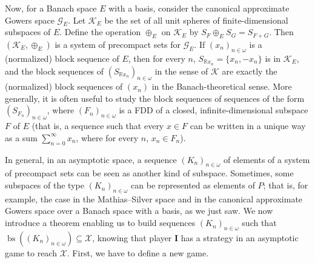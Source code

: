\documentclass[a4paper,11pt]{article}
\theoremstyle{definition}
\numberwithin{equation}{section}
\newcommand{\R}{\mathbb{R}}
\newcommand{\X}{\mathcal{X}}
\newcommand{\G}{\mathcal{G}}
\newcommand{\I}{\textbf{I}}
\newcommand{\K}{\mathcal{K}}
\DeclareMathOperator{\bs}{bs}
\begin{document}
\smallskip

Now, for a Banach space $E$ with a basis, consider the canonical approximate Gowers space $\G_E$. Let $\K_E$ be the set of all unit spheres of finite-dimensional subspaces of $E$. Define the operation $\oplus_E$ on $\K_E$ by $S_F \oplus_E S_G = S_{F + G}$. Then $(\K_E, \oplus_E)$ is a system of precompact sets for $\G_E$. If $(x_n)_{n \in \omega}$ is a (normalized) block sequence of $E$, then for every $n$, $S_{\R x_n} = \{x_n, -x_n\}$ is in $\K_E$, and the block sequences of $(S_{\R x_n})_{n \in \omega}$ in the sense of $\K$ are exactly the (normalized) block sequences of $(x_n)$ in the Banach-theoretical sense. More generally, it is often useful to study the block sequences of sequences of the form $(S_{F_n})_{n \in \omega}$, where $(F_n)_{n \in \omega}$ is a FDD of a closed, infinite-dimensional subspace $F$ of $E$ (that is, a sequence such that every $x \in F$ can be written in a unique way as a sum $\sum_{n = 0}^\infty x_n$, where for every $n$, $x_n \in F_n$).

\smallskip

In general, in an asymptotic space, a sequence $(K_n)_{n \in \omega}$ of elements of a system of precompact sets can be seen as another kind of subspace. Sometimes, some subspaces of the type $(K_n)_{n \in \omega}$ can be represented as elements of $P$; that is, for example, the case in the Mathias--Silver space and in the canonical approximate Gowers space over a Banach space with a basis, as we just saw. We now introduce a theorem enabling us to build sequences $(K_n)_{n \in \omega}$ such that $\bs((K_n)_{n \in \omega}) \subseteq \X$, knowing that player \I{} has a strategy in an asymptotic game to reach $\X$. First, we have to define a new game.
\end{document}
